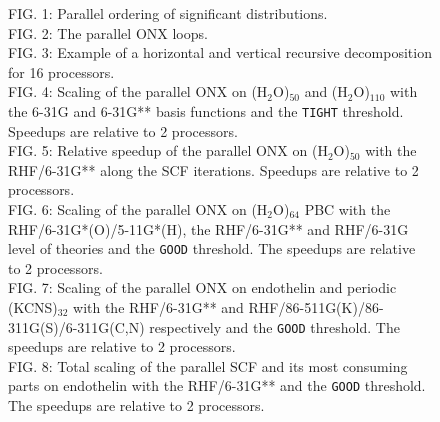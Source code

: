 \documentclass[prl,preprint,doublespace]{revtex4} %
\begin{document}
{\begin{figure}[h]
   FIG. 1: Parallel ordering of significant distributions.\\
   FIG. 2: The parallel ONX loops.\\
   FIG. 3: Example of a horizontal and vertical recursive decomposition for 16 processors.\\
   FIG. 4: Scaling of the parallel ONX on (H$_2$O)$_{50}$
    and (H$_2$O)$_{110}$ with the 6-31G and 6-31G**
    basis functions and the {\tt TIGHT} threshold.
    Speedups are relative to 2 processors.\\
   FIG. 5: Relative speedup of the parallel ONX on (H$_2$O)$_{50}$ with the RHF/6-31G**
    along the SCF iterations.
    Speedups are relative to 2 processors.\\
   FIG. 6: Scaling of the parallel ONX on (H$_2$O)$_{64}$ PBC with the RHF/6-31G*(O)/5-11G*(H),
    the RHF/6-31G** and RHF/6-31G level of theories and the {\tt GOOD} threshold.
    The speedups are relative to 2 processors.\\
   FIG. 7: Scaling of the parallel ONX on endothelin and periodic (KCNS)$_{32}$ with
    the RHF/6-31G** and RHF/86-511G(K)/86-311G(S)/6-311G(C,N)
    respectively and the {\tt GOOD} threshold.
    The speedups are relative to 2 processors.\\
   FIG. 8: Total scaling of the parallel SCF and its most consuming parts
    on endothelin with the RHF/6-31G**
    and the {\tt GOOD} threshold.
    The speedups are relative to 2 processors.\\

\end{figure}

}
\end{document}
